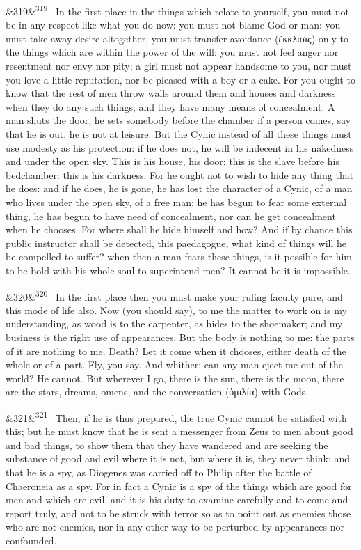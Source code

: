 \documentclass[12pt]{article}
\newcommand{\para}[1][]{\par\noindent\ifx&#1&\else\textsuperscript{\footnotesize #1}~\fi}
\begin{document}
\para[319] In the first place in the things which relate to yourself, you must not be in any respect like what you do now: you must not blame God or man: you must take away desire altogether, you must transfer avoidance (ἔκκλισις) only to the things which are within the power of the will: you must not feel anger nor resentment nor envy nor pity; a girl must not appear handsome to you, nor must you love a little reputation, nor be pleased with a boy or a cake. For you ought to know that the rest of men throw walls around them and houses and darkness when they do any such things, and they have many means of concealment. A man shuts the door, he sets somebody before the chamber if a person comes, say that he is out, he is not at leisure. But the Cynic instead of all these things must use modesty as his protection: if he does not, he will be indecent in his nakedness and under the open sky. This is his house, his door: this is the slave before his bedchamber: this is his darkness. For he ought not to wish to hide any thing that he does: and if he does, he is gone, he has lost the character of a Cynic, of a man who lives under the open sky, of a free man: he has begun to fear some external thing, he has begun to have need of concealment, nor can he get concealment when he chooses. For where shall he hide himself and how? And if by chance this public instructor shall be detected, this paedagogue, what kind of things will he be compelled to suffer? when then a man fears these things, is it possible for him to be bold with his whole soul to superintend men? It cannot be it is impossible.

\para[320] In the first place then you must make your ruling faculty pure, and this mode of life also. Now (you should say), to me the matter to work on is my understanding, as wood is to the carpenter, as hides to the shoemaker; and my business is the right use of appearances. But the body is nothing to me: the parts of it are nothing to me. Death? Let it come when it chooses, either death of the whole or of a part. Fly, you say. And whither; can any man eject me out of the world? He cannot. But wherever I go, there is the sun, there is the moon, there are the stars, dreams, omens, and the conversation (ὁμιλία) with Gods.

\para[321] Then, if he is thus prepared, the true Cynic cannot be satisfied with this; but he must know that he is sent a messenger from Zeus to men about good and bad things, to show them that they have wandered and are seeking the substance of good and evil where it is not, but where it is, they never think; and that he is a spy, as Diogenes was carried off to Philip after the battle of Chaeroneia as a spy. For in fact a Cynic is a spy of the things which are good for men and which are evil, and it is his duty to examine carefully and to come and report truly, and not to be struck with terror so as to point out as enemies those who are not enemies, nor in any other way to be perturbed by appearances nor confounded.
\end{document}
